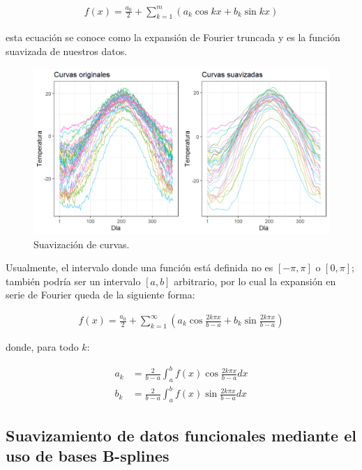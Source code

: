\documentclass[
]{book}
\begin{document}
\begin{align}
     f(x)=\frac{a_0}{2}+\sum_{k=1}^m(a_k\cos{kx}+b_k\sin{kx})
\end{align}

esta ecuación se conoce como la expansión de Fourier truncada y es la función suavizada de nuestros datos.

\begin{figure}
\includegraphics[width=17.78in]{figuras/otros/suves_fda} \caption{Suavización de curvas.}\label{fig:suaves}
\end{figure}

Usualmente, el intervalo donde una función está definida no es \([-\pi,\pi]\) o \([0,\pi]\); también podría ser un intervalo \([a,b]\) arbitrario, por lo cual la expansión en serie de Fourier queda de la siguiente forma:

\begin{align}
    f(x)=\frac{a_0}{2}+\sum_{k=1}^\infty\left(a_k\cos{\frac{2k\pi x}{b-a}} + b_k\sin{\frac{2k\pi x}{b-a}} \right)
\end{align}

donde, para todo \(k\):

\begin{align}
    a_k&=\frac{2}{b-a}\int_a^bf(x)\cos{\frac{2k\pi x}{b-a}}dx\\
    b_k&=\frac{2}{b-a}\int_a^bf(x)\sin{\frac{2k\pi x}{b-a}}dx
\end{align}

\hypertarget{suavizamiento-de-datos-funcionales-mediante-el-uso-de-bases-b-splines}{%
\subsection*{Suavizamiento de datos funcionales mediante el uso de bases B-splines}\label{suavizamiento-de-datos-funcionales-mediante-el-uso-de-bases-b-splines}}
\end{document}
